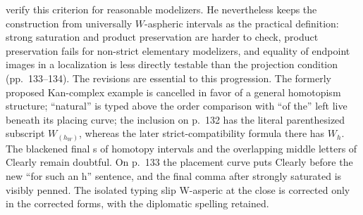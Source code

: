 verify this criterion for reasonable modelizers. He nevertheless keeps the construction from universally $W$-aspheric intervals as the practical definition: strong saturation and product preservation are harder to check, product preservation fails for non-strict elementary modelizers, and equality of endpoint images in a localization is less directly testable than the projection condition (pp.~133--134). The revisions are essential to this progression. The formerly proposed Kan-complex example is cancelled in favor of a general homotopism structure; ``natural'' is typed above the order comparison with ``of the'' left live beneath its placing curve; the inclusion on p.~132 has the literal parenthesized subscript $W_{(h_W)}$, whereas the later strict-compatibility formula there has $W_h$. The blackened final s of homotopy intervals and the overlapping middle letters of Clearly remain doubtful. On p.~133 the placement curve puts Clearly before the new ``for such an h'' sentence, and the final comma after strongly saturated is visibly penned. The isolated typing slip W-asperic at the close is corrected only in the corrected forms, with the diplomatic spelling retained.

